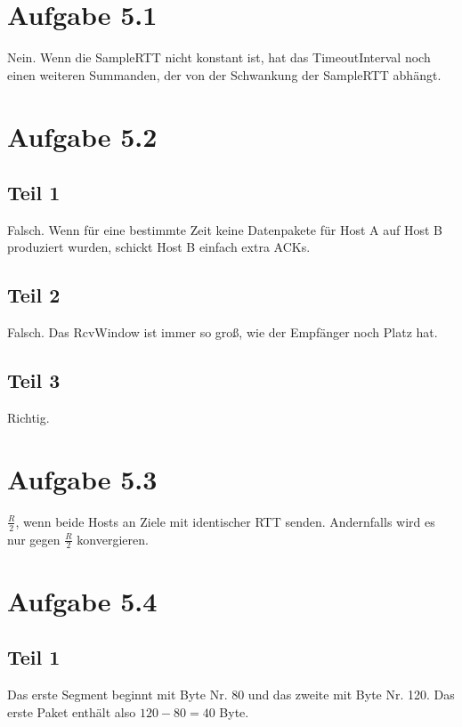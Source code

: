 \documentclass[10pt,a4paper]{article}
\begin{document}
\section{Aufgabe 5.1}

Nein. Wenn die SampleRTT nicht konstant ist, hat das TimeoutInterval noch einen
weiteren Summanden, der von der Schwankung der SampleRTT abhängt.

\section{Aufgabe 5.2}

\subsection{Teil 1}

Falsch. Wenn für eine bestimmte Zeit keine Datenpakete für Host A auf Host B
produziert wurden, schickt Host B einfach extra ACKs.

\subsection{Teil 2}

Falsch. Das RcvWindow ist immer so groß, wie der Empfänger noch Platz hat.

\subsection{Teil 3}

Richtig.

\section{Aufgabe 5.3}

$\frac{R}{2}$, wenn beide Hosts an Ziele mit identischer RTT senden. Andernfalls wird es nur gegen $\frac{R}{2}$ konvergieren.

\section{Aufgabe 5.4}

\subsection{Teil 1}

Das erste Segment beginnt mit Byte Nr. 80 und das zweite mit Byte Nr. 120. Das
erste Paket enthält also $120 - 80 = 40$ Byte.
\end{document}
